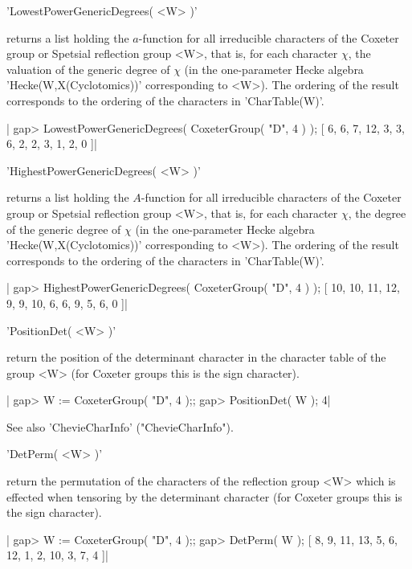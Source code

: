
'LowestPowerGenericDegrees( <W> )'

returns  a list holding the $a$-function  for all irreducible characters of
the  Coxeter  group  or  Spetsial  reflection  group <W>, that is, for each
character  $\chi$, the  valuation of  the generic  degree of $\chi$ (in the
one-parameter  Hecke  algebra  'Hecke(W,X(Cyclotomics))'  corresponding  to
<W>).  The  ordering  of  the  result  corresponds  to  the ordering of the
characters in 'CharTable(W)'.

|    gap> LowestPowerGenericDegrees( CoxeterGroup( "D", 4 ) );
    [ 6, 6, 7, 12, 3, 3, 6, 2, 2, 3, 1, 2, 0 ]|


'HighestPowerGenericDegrees( <W> )'

returns  a list holding the $A$-function  for all irreducible characters of
the  Coxeter  group  or  Spetsial  reflection  group <W>, that is, for each
character  $\chi$,  the  degree  of  the  generic  degree of $\chi$ (in the
one-parameter  Hecke  algebra  'Hecke(W,X(Cyclotomics))'  corresponding  to
<W>).  The  ordering  of  the  result  corresponds  to  the ordering of the
characters in 'CharTable(W)'.

|    gap> HighestPowerGenericDegrees( CoxeterGroup( "D", 4 ) );
    [ 10, 10, 11, 12, 9, 9, 10, 6, 6, 9, 5, 6, 0 ]|


'PositionDet( <W> )'

return  the position of the determinant character in the character table of
the group <W> (for Coxeter groups this is the sign character).

|    gap> W := CoxeterGroup( "D", 4 );;
    gap> PositionDet( W );
    4|

See also 'ChevieCharInfo' ("ChevieCharInfo").


'DetPerm( <W> )'

return  the permutation of the characters of the reflection group <W> which
is effected when tensoring by the determinant character (for Coxeter groups
this is the sign character).

|    gap> W := CoxeterGroup( "D", 4 );;
    gap> DetPerm( W );
    [ 8, 9, 11, 13, 5, 6, 12, 1, 2, 10, 3, 7, 4 ]|

